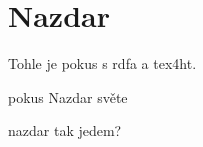 \documentclass{article}
\begin{document}
\section{Nazdar}

Tohle je pokus s rdfa a tex4ht. 

\begin{subject}{pokus}
Nazdar světe

\begin{subject}{nazdar}
tak jedem?
\end{subject}

\end{subject}
\end{document}

